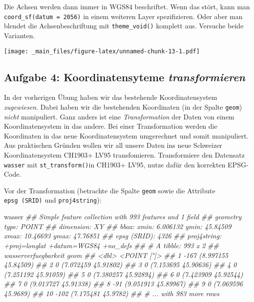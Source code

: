 \documentclass[]{book}
\newenvironment{Shaded}{\begin{snugshade}}{\end{snugshade}}
\newcommand{\CommentTok}[1]{\textcolor[rgb]{0.56,0.35,0.01}{\textit{#1}}}
\newcommand{\NormalTok}[1]{#1}
\begin{document}
Die Achsen werden dann immer in WGS84 beschriftet. Wenn das stört, kann man \texttt{coord\_sf(datum\ =\ 2056)} in einem weiteren Layer spezifizieren. Oder aber man blendet die Achsenbeschriftung mit \texttt{theme\_void()} komplett aus. Versuche beide Varianten.

\texttt{[image: \_main\_files/figure-latex/unnamed-chunk-13-1.pdf]}

\hypertarget{aufgabe-4-koordinatensyteme-transformieren}{%
\subsection{\texorpdfstring{Aufgabe 4: Koordinatensyteme \emph{transformieren}}{Aufgabe 4: Koordinatensyteme transformieren}}\label{aufgabe-4-koordinatensyteme-transformieren}}

In der vorherigen Übung haben wir das bestehende Koordinatensystem \emph{zugewiesen}. Dabei haben wir die bestehenden Koordinaten (in der Spalte \texttt{geom}) \emph{nicht} manipuliert. Ganz anders ist eine \emph{Transformation} der Daten von einem Koordinatensystem in das andere. Bei einer Transformation werden die Koordinaten in das neue Koordinatensystem umgerechnet und somit manipuliert. Aus praktischen Gründen wollen
wir all unsere Daten ins neue Schweizer Koordinatensystem CH1903+ LV95 transfomieren. Transformiere den Datensatz \texttt{wasser} mit \texttt{st\_transform()}in CH1903+ LV95, nutze dafür den korrekten EPSG-Code.

Vor der Transformation (betrachte die Spalte \texttt{geom} sowie die Attribute \texttt{epsg\ (SRID)} und \texttt{proj4string}):

\begin{Shaded}
\begin{Highlighting}[]
\NormalTok{wasser}
\CommentTok{## Simple feature collection with 993 features and 1 field}
\CommentTok{## geometry type:  POINT}
\CommentTok{## dimension:      XY}
\CommentTok{## bbox:           xmin: 6.006132 ymin: 45.84509 xmax: 10.46693 ymax: 47.76851}
\CommentTok{## epsg (SRID):    4326}
\CommentTok{## proj4string:    +proj=longlat +datum=WGS84 +no_defs}
\CommentTok{## # A tibble: 993 x 2}
\CommentTok{##    wasserverfuegbarkeit                geom}
\CommentTok{##                   <dbl>         <POINT [°]>}
\CommentTok{##  1                 -167 (8.997155 45.84509)}
\CommentTok{##  2                    0 (7.072459 45.91802)}
\CommentTok{##  3                    0 (7.153695 45.90636)}
\CommentTok{##  4                    0 (7.251192 45.91059)}
\CommentTok{##  5                    0 (7.380257 45.92894)}
\CommentTok{##  6                    0 (7.423909 45.92544)}
\CommentTok{##  7                    0 (9.013727 45.91338)}
\CommentTok{##  8                  -91 (9.051913 45.89967)}
\CommentTok{##  9                    0  (7.069596 45.9689)}
\CommentTok{## 10                 -102  (7.175481 45.9782)}
\CommentTok{## # ... with 983 more rows}
\end{Highlighting}
\end{Shaded}
\end{document}

